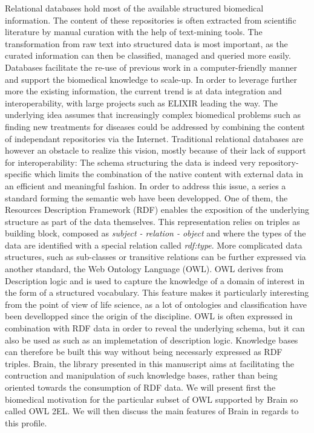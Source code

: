 \documentclass{bioinfo}
\begin{document}
Relational databases hold most of the available structured biomedical information. The content of these repositories is often
extracted from scientific literature by manual curation with the help of text-mining tools. The transformation from raw text into
structured data is most important, as the curated information can then be classified, managed and queried more easily. Databases facilitate
the re-use of previous work in a computer-friendly manner and support the biomedical knowledge to scale-up. In order to leverage further 
more the existing information, the current trend is at data integration and interoperability, with large projects such as ELIXIR leading the way.
The underlying idea assumes that increasingly complex biomedical problems such as finding new treatments for diseases could be addressed 
by combining the content of independant repositories via the Internet. 
Traditional relational databases are however an obstacle to realize this vision, mostly because of their lack of support for interoperability:
The schema structuring the data is indeed very repository-specific which limits the combination of the native content with external data in an
efficient and meaningful fashion. In order to address this issue, a series a standard forming the semantic web have been developped. One of them,
the Resources Description Framework (RDF) enables the exposition of the underlying structure as part of the data themselves. This
representation relies on triples as building block, composed as \emph{subject - relation - object} and where 
the types of the data are identified with a special relation called \emph{rdf:type}. More complicated data structures, such as sub-classes or
transitive relations can be further expressed via another standard, the Web Ontology Language (OWL). OWL derives from Description logic and
is used to capture the knowledge of a domain of interest in the form of a structured vocabulary. This feature makes it particularly 
interesting from the point of view of life science, as a lot of ontologies and classification have been devellopped since the origin of 
the discipline. OWL is often expressed in combination with RDF data in order to reveal the underlying schema, but 
it can also be used as such as an implemetation of description logic. Knowledge bases can therefore be built this way without being
necessarly expressed as RDF triples. Brain, the library presented in this manuscript aims at facilitating the contruction and manipulation of 
such knowledge bases, rather than being oriented towards the consumption of RDF data. We will present first the biomedical motivation for 
the particular subset of OWL supported by Brain so called OWL 2EL. We will then discuss the main features of Brain in regards to this profile.
\end{document}
